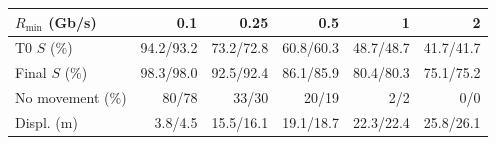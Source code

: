 \begin{tabular}{@{}lrrrrr@{}}
\toprule
$R_{\min}$ (Gb/s) & 0.1 & 0.25 & 0.5 & 1 & 2 \\
\midrule
T0 $S$ (\%) & 94.2/93.2 & 73.2/72.8 & 60.8/60.3 & 48.7/48.7 & 41.7/41.7 \\
Final $S$ (\%) & 98.3/98.0 & 92.5/92.4 & 86.1/85.9 & 80.4/80.3 & 75.1/75.2 \\
No movement (\%) & 80/78 & 33/30 & 20/19 & 2/2 & 0/0 \\
Displ. (m) & 3.8/4.5 & 15.5/16.1 & 19.1/18.7 & 22.3/22.4 & 25.8/26.1 \\
\bottomrule
\end{tabular}
